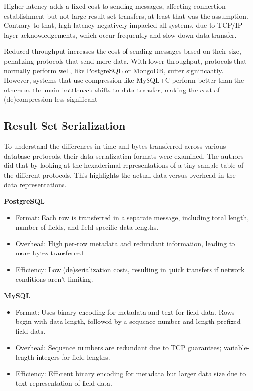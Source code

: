 \documentclass[sigconf]{acmart}
\begin{document}
Higher latency adds a fixed cost to sending messages, affecting connection establishment but not large result set transfers, at least that was the assumption. Contrary to that, high latency negatively impacted all systems, due to TCP/IP layer acknowledgements, which occur frequently and slow down data transfer.

Reduced throughput increases the cost of sending messages based on their size, penalizing protocols that send more data. With lower throughput, protocols that normally perform well, like PostgreSQL or MongoDB, suffer significantly. However, systems that use compression like MySQL+C perform better than the others as the main bottleneck shifts to data transfer, making the cost of (de)compression less significant

\subsection{Result Set Serialization}
To understand the differences in time and bytes transferred across various database protocols, their data serialization formats were examined. The authors did that by looking at the hexadecimal representations of a tiny sample table of the different protocols. This highlights the actual data versus overhead in the data representations.

\textbf{PostgreSQL}
\begin{itemize}
  \item Format: Each row is transferred in a separate message, including total length, number of fields, and field-specific data lengths.
  \item Overhead: High per-row metadata and redundant information, leading to more bytes transferred.
  \item Efficiency: Low (de)serialization costs, resulting in quick transfers if network conditions aren't limiting.
\end{itemize}

\textbf{MySQL}
\begin{itemize}
  \item Format: Uses binary encoding for metadata and text for field data. Rows begin with data length, followed by a sequence number and length-prefixed field data.
  \item Overhead: Sequence numbers are redundant due to TCP guarantees; variable-length integers for field lengths.
  \item Efficiency: Efficient binary encoding for metadata but larger data size due to text representation of field data.
\end{itemize}
\end{document}
